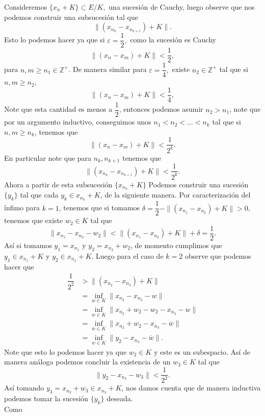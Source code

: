 \begin{itemize}
\begin{itemize}
\begin{sproof}
            Consideremos $\{x_n+K\}\subset E/K,$ una sucesión de Cauchy, luego observe que nos podemos construir una subsucesión tal que 
            $$\|(x_{n_k}-x_{n_{k+1}})+K\|.$$
            Esto lo podemos hacer ya que si $\varepsilon=\dfrac{1}{2},$ como la sucesión es Cauchy
            $$\|(x_n-x_m)+K\|<\dfrac{1}{2},$$
            para $n,m\geq n_1\in \mathbb{Z}^+$. De manera similar para $\varepsilon=\dfrac{1}{4},$ existe $n_2\in \mathbb{Z}^+$ tal que si $n,m\geq n_2$,
            $$\|(x_n-x_m)+K\|<\dfrac{1}{4},$$
            Note que esta cantidad es menos a $\dfrac{1}{2}$, entonces podemos asumir $n_2>n_1$, note que por un argumento inductivo,  conseguimos unos $n_1<n_2<\dots<n_k$ tal que si $n,m\geq n_k$, tenemos que
            $$\|(x_n-x_m)+K\|<\dfrac{1}{2^k}.$$
            En particular note que para $n_k,n_{k+1}$ tenemos que
            $$\|(x_{n_k}-x_{n_{k+1}})+K\|<\dfrac{1}{2^k}.$$
            Ahora a partir de esta subsucesión $\{x_{n_k}+K\}$ Podemos construir una sucesión $\{y_k\}$ tal que cada $y_k\in x_{n_k}+K$, de la siguiente manera. Por caracterización del ínfimo para $k=1$, tenemos que si tomamos $\delta=\dfrac{1}{2}-\|(x_{n_1}-x_{n_2})+K\|>0$, tenemos que existe $w_2\in K$ tal que
            $$\|x_{n_1}-x_{n_2}-w_2\|<\|(x_{n_1}-x_{n_2})+K\|+\delta=\dfrac{1}{2}.$$
            Así si tomamos $y_1=x_{n_1}$ y $y_2=x_{n_2}+w_2$, de momento cumplimos que $y_1\in x_{n_1}+K$ y $y_2\in x_{n_2}+K$. Luego para el caso de $k=2$ observe que podemos hacer que
            \begin{align*}
               \dfrac{1}{2^2}&>\|(x_{n_2}-x_{n_3})+K\|\\
               &=\inf_{w\in K}\|x_{n_2}-x_{n_3}-w\|\\
               &=\inf_{w\in K}\|x_{n_2}+w_2-w_2-x_{n_3}-w\|\\
               &=\inf_{\overline{w}\in K}\|x_{n_2}+w_2-x_{n_3}-\overline{w}\|\\
               &=\inf_{\overline{w}\in K}\|y_2-x_{n_3}-\overline{w}\|.
            \end{align*}
            Note que esto lo podemos hacer ya que $w_2\in K$ y este es un subespacio. Así de manera análoga podemos concluir la existencia de un $w_3\in K$ tal que 
            $$\|y_2-x_{n_3}-w_3\|<\dfrac{1}{2^2}.$$
             Así tomando $y_3=x_{n_3}+w_3\in x_{n_3}+K$, nos damos cuenta que de manera inductiva podemos tomar la sucesión $\{y_k\}$ deseada.\\ Como


\end{sproof}
\end{itemize}
\end{itemize}
